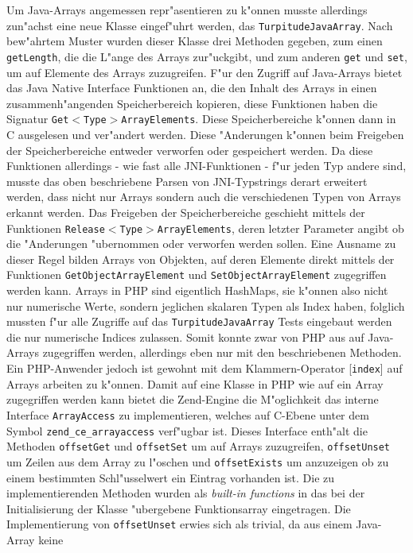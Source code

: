Um Java-Arrays angemessen repr"asentieren zu k"onnen musste 
allerdings zun"achst eine neue Klasse eingef"uhrt werden, das \texttt{TurpitudeJavaArray}. Nach bew"ahrtem Muster wurden dieser Klasse drei Methoden
gegeben, zum einen \texttt{getLength}, die die L"ange des Arrays zur"uckgibt, und zum anderen \texttt{get} und \texttt{set}, um auf Elemente des Arrays zuzugreifen.
F"ur den Zugriff auf Java-Arrays bietet das Java Native Interface Funktionen an, die den Inhalt des Arrays in einen zusammenh"angenden Speicherbereich kopieren,
diese Funktionen haben die Signatur \texttt{Get$<$Type$>$ArrayElements}. Diese Speicherbereiche k"onnen  dann in C ausgelesen und ver"andert werden. 
Diese "Anderungen k"onnen beim Freigeben der Speicherbereiche entweder verworfen oder gespeichert werden. Da diese
Funktionen allerdings - wie fast alle JNI-Funktionen - f"ur jeden Typ andere sind, musste das oben beschriebene Parsen von JNI-Typstrings derart erweitert werden,
dass nicht nur Arrays sondern auch die verschiedenen Typen von Arrays erkannt werden. Das Freigeben der Speicherbereiche geschieht mittels der
Funktionen \texttt{Release$<$Type$>$ArrayElements}, deren letzter Parameter angibt ob die "Anderungen "ubernommen oder verworfen werden sollen.
Eine Ausname zu dieser Regel bilden Arrays von Objekten, auf deren Elemente direkt mittels der Funktionen \texttt{GetObjectArrayElement} und
\texttt{SetObjectArrayElement} zugegriffen werden kann.
Arrays in PHP sind eigentlich HashMaps, sie k"onnen also nicht nur numerische Werte, sondern jeglichen skalaren Typen als Index haben, folglich mussten
f"ur alle Zugriffe auf das \texttt{TurpitudeJavaArray} Tests eingebaut werden die nur numerische Indices zulassen.
Somit konnte zwar von PHP aus auf Java-Arrays zugegriffen werden,
allerdings eben nur mit den beschriebenen Methoden. Ein PHP-Anwender jedoch ist gewohnt mit dem Klammern-Operator [\texttt{index}] auf Arrays arbeiten zu k"onnen.
Damit auf eine Klasse in PHP wie auf ein Array zugegriffen werden kann bietet die Zend-Engine die M"oglichkeit das interne Interface \texttt{ArrayAccess} zu
implementieren, welches auf C-Ebene unter dem Symbol \texttt{zend\_ce\_arrayaccess} verf"ugbar ist. Dieses Interface enth"alt die Methoden \texttt{offsetGet} und
\texttt{offsetSet} um auf Arrays zuzugreifen, \texttt{offsetUnset} um Zeilen aus dem Array zu l"oschen und \texttt{offsetExists} um anzuzeigen ob zu einem
bestimmten Schl"usselwert ein Eintrag vorhanden ist. Die zu implementierenden Methoden wurden als \emph{built-in functions} in das bei der Initialisierung der
Klasse "ubergebene Funktionsarray eingetragen. Die Implementierung von \texttt{offsetUnset} erwies sich als trivial, da aus einem Java-Array keine
